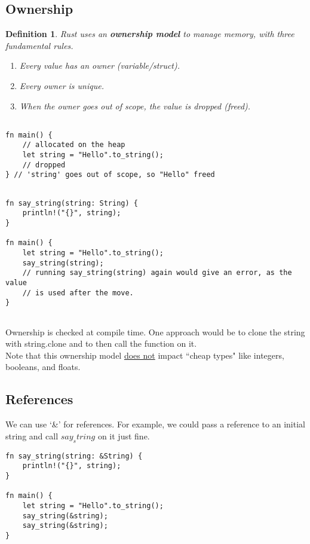 \documentclass[12pt]{amsart}
\newtheorem{definition}{Definition}
\begin{document}
\subsection{Ownership}

\begin{definition}
Rust uses an \textbf{ownership model} to manage memory, with three fundamental rules.
\begin{enumerate}
\item Every value has an owner (variable/struct).
\item Every owner is unique.
\item When the owner goes out of scope, the value is dropped (freed).
\end{enumerate}
\end{definition}

\begin{lstlisting}

fn main() {
    // allocated on the heap
    let string = "Hello".to_string();
    // dropped
} // 'string' goes out of scope, so "Hello" freed


\end{lstlisting}


\begin{lstlisting}
fn say_string(string: String) {
    println!("{}", string);
}

fn main() {
    let string = "Hello".to_string();
    say_string(string);
    // running say_string(string) again would give an error, as the value
    // is used after the move.
} 


\end{lstlisting}

Ownership is checked at compile time. One approach would be to clone the string with string.clone and to then call the function on it. \\

Note that this ownership model \underline{does not} impact ``cheap types" like integers, booleans, and floats.

\subsection{References}
We can use `\&' for references. For example, we could pass a reference to an initial string and call $say_string$ on it just fine.

\begin{lstlisting}
fn say_string(string: &String) {
    println!("{}", string);
}

fn main() {
    let string = "Hello".to_string();
    say_string(&string);
    say_string(&string);
}
\end{lstlisting} 
    
\end{document}
